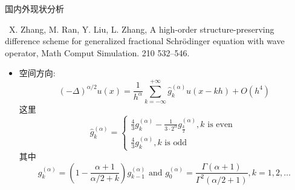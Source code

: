 \documentclass[aspectratio=169]{beamer}
\numberwithin{theorem}{section} %
\numberwithin{equation}{section}%
\numberwithin{figure}{section}%
\numberwithin{table}{section}%
\begin{document}
\begin{frame}{国内外现状分析}
	\begin{exampleblock}{\footnotesize \cite{zhangHighorderStructurepreservingDifference2023} \ X. Zhang, M. Ran, Y. Liu, L. Zhang, A high-order structure-preserving difference scheme for generalized fractional Schrödinger equation with wave operator, Math Comput Simulation. 210 {\color{purple}{(2023)}}  532–546.}
		\footnotesize
		\begin{itemize}
		\item 空间方向:
		\begin{equation*}
			(-\Delta)^{\alpha / 2} u(x)=\frac{1}{h^\alpha} \sum_{k=-\infty}^{+\infty} \widehat{g}_k^{(\alpha)} u(x-k h)+O\left(h^4\right)
			\end{equation*}
			这里
			\begin{equation*}
			\widehat{g}_k^{(\alpha)}=\left\{\begin{array}{l}
			\frac{4}{3} g_k^{(\alpha)}-\frac{1}{3 \cdot 2^\alpha} g_{\frac{k}{2}}^{(\alpha)}, k \text { is even } \\
			\frac{4}{3} g_k^{(\alpha)}, k \text { is odd }
			\end{array}\right.
			\end{equation*}
			其中
			\begin{equation*}
			g_k^{(\alpha)}=\left(1-\frac{\alpha+1}{\alpha / 2+k}\right) g_{k-1}^{(\alpha)} \text { and } g_0^{(\alpha)}=\frac{\Gamma(\alpha+1)}{\Gamma^2(\alpha / 2+1)}, k=1,2, \ldots
			\end{equation*}
			\end{itemize}
	\end{exampleblock}
	\end{frame}
\end{document}
